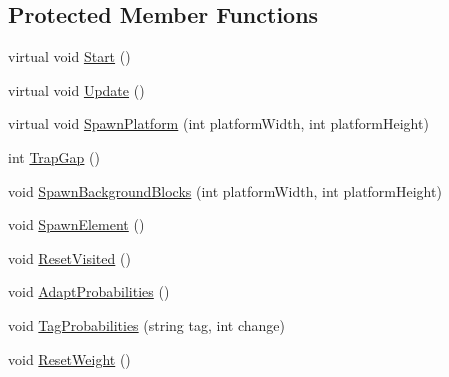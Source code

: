 \subsection*{Protected Member Functions}
\begin{DoxyCompactItemize}
\item 
virtual void \mbox{\hyperlink{class_platforms_generation_controller_a3bc338f320d39a1a549648d2ce11074d}{Start}} ()
\item 
virtual void \mbox{\hyperlink{class_platforms_generation_controller_ad014a93027f02d91fb93698b8f872606}{Update}} ()
\item 
virtual void \mbox{\hyperlink{class_platforms_generation_controller_a17255efc120393f5e6a2decd303c33b1}{Spawn\+Platform}} (int platform\+Width, int platform\+Height)
\item 
int \mbox{\hyperlink{class_platforms_generation_controller_a24c92b696b3dfefb3ea9b0e554fe70d3}{Trap\+Gap}} ()
\item 
void \mbox{\hyperlink{class_platforms_generation_controller_a650ebb25191671bf10970f2ebd5b80f7}{Spawn\+Background\+Blocks}} (int platform\+Width, int platform\+Height)
\item 
void \mbox{\hyperlink{class_platforms_generation_controller_ae3a28f38bdbb0c9847ef5ab4538b8f17}{Spawn\+Element}} ()
\item 
void \mbox{\hyperlink{class_platforms_generation_controller_a9a5fec18fdac19bd97a970210d230619}{Reset\+Visited}} ()
\item 
void \mbox{\hyperlink{class_platforms_generation_controller_ab45ad4c42b43ad7eebc92ac79d4ddb51}{Adapt\+Probabilities}} ()
\item 
void \mbox{\hyperlink{class_platforms_generation_controller_ab12ea5197eb0395e3863e5ca8059881b}{Tag\+Probabilities}} (string tag, int change)
\item 
void \mbox{\hyperlink{class_platforms_generation_controller_abb5b86c9cc92d660b8ed16d2ebb7e81f}{Reset\+Weight}} ()
\end{DoxyCompactItemize}

